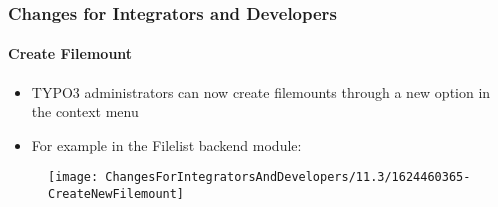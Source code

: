 %

\begin{frame}[fragile]
	\frametitle{Changes for Integrators and Developers}
	\framesubtitle{Create Filemount}


	\begin{itemize}
		\item TYPO3 administrators can now create filemounts through a new
			option in the context menu
		\item For example in the Filelist backend module:
	\end{itemize}

	\begin{figure}
		\texttt{[image: ChangesForIntegratorsAndDevelopers/11.3/1624460365-CreateNewFilemount]}
	\end{figure}

\end{frame}


